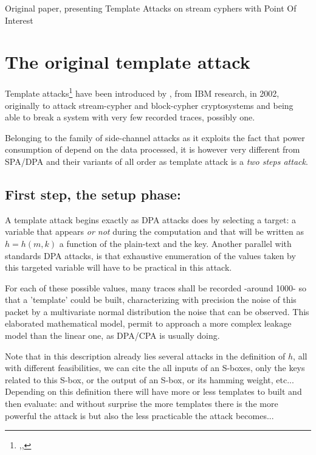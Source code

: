 \begin{center}
	Original paper, presenting Template Attacks on stream cyphers with Point Of Interest \\
\end{center}
\section{The original template attack}


Template attacks\footnote{
,,
} 
have been introduced by \citeauthor*{ches-2002-chari}, from IBM research, in 2002, originally to attack stream-cypher and block-cypher cryptosystems and being able to break a system with very few recorded traces, possibly one.


Belonging to the family of side-channel attacks as it exploits the fact that power consumption
of depend on the data processed, it is however very different
from SPA/DPA and their variants of all order as template attack is a 
\textit{two steps attack}.


\subsection*{First step, the setup phase:}

A template attack begins exactly as DPA attacks does by selecting a target:
a variable that appears \textit{or not} during the computation and that will be written as
$h=h(m,k)$ a function of the plain-text and the key.
Another parallel with standards DPA attacks, is that exhaustive enumeration of the values
taken by this targeted variable will have to be practical in this attack.

For each of these possible values, many traces shall be recorded -around 1000- so that 
a 'template' could be built, characterizing with precision the noise of this packet by 
a multivariate normal distribution the noise that can be observed. 
This elaborated mathematical model, permit to approach a more complex leakage 
model than the linear one, as DPA/CPA is usually doing.

Note that in this description already lies several attacks in the 
definition of $h$, all with different feasibilities, we can cite the all inputs of an S-boxes, 
only the keys related to this S-box,
or the output of an S-box, or its hamming weight, etc... Depending on this definition
there will have more or less templates to built and then evaluate: and without surprise
the more templates there is the more powerful the attack is but also the 
less practicable the attack becomes...

